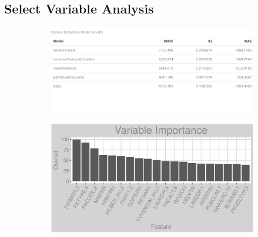 \subsection{Select Variable Analysis}
\label{appendix:fuel_oil:sva}
\begin{figure}[h]
\centering
\begin{subfigure}{0.8\textwidth}
\centering
\includegraphics[width=.99\textwidth, height=0.35\textheight]{Images/fuel_oil_fe_summary.png}
\end{subfigure}
\begin{subfigure}{1\textwidth}
\centering
\includegraphics[width=.99\textwidth, height=0.35\textheight]{Images/fuel_oil_all_vars.png}
\end{subfigure}
\end{figure}
\FloatBarrier
\newpage
